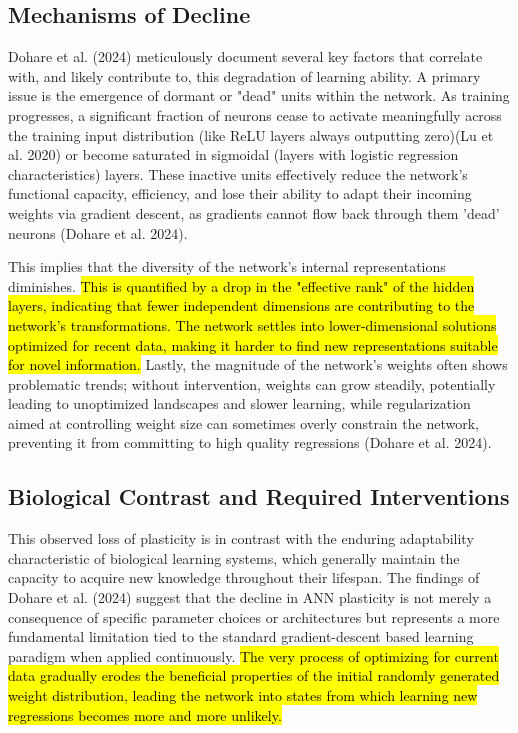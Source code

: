\documentclass[
10pt, %
a4paper, %
oneside, %
headinclude,footinclude, %
BCOR5mm, %
]{scrartcl}
\begin{document}
\subsection{Mechanisms of Decline}

Dohare et al. (2024) meticulously document several key factors that correlate with, and likely contribute to, this degradation of learning ability. A primary issue is the emergence of dormant or "dead" units within the network. As training progresses, a significant fraction of neurons cease to activate meaningfully across the training input distribution (like ReLU layers always outputting zero)(Lu et al. 2020) or become saturated in sigmoidal (layers with logistic regression characteristics) layers. These inactive units effectively reduce the network's functional capacity, efficiency, and lose their ability to adapt their incoming weights via gradient descent, as gradients cannot flow back through them 'dead' neurons (Dohare et al. 2024). 

This implies that the diversity of the network's internal representations diminishes. \hl{This is quantified by a drop in the "effective rank" of the hidden layers, indicating that fewer independent dimensions are contributing to the network's transformations. The network settles into lower-dimensional solutions optimized for recent data, making it harder to find new representations suitable for novel information. }Lastly, the magnitude of the network's weights often shows problematic trends; without intervention, weights can grow steadily, potentially leading to unoptimized landscapes and slower learning, while regularization aimed at controlling weight size can sometimes overly constrain the network, preventing it from committing to high quality regressions (Dohare et al. 2024).

\subsection{Biological Contrast and Required Interventions}

This observed loss of plasticity is in contrast with the enduring adaptability characteristic of biological learning systems, which generally maintain the capacity to acquire new knowledge throughout their lifespan. The findings of Dohare et al. (2024) suggest that the decline in ANN plasticity is not merely a consequence of specific parameter choices or architectures but represents a more fundamental limitation tied to the standard gradient-descent based learning paradigm when applied continuously. \hl{The very process of optimizing for current data gradually erodes the beneficial properties of the initial randomly generated weight distribution, leading the network into states from which learning new regressions becomes more and more unlikely.} 
\end{document}
